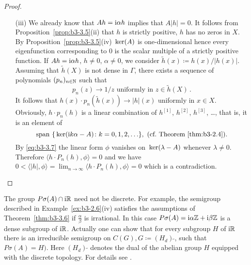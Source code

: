 \begin{proof}
\begin{enumerate}[wide, labelindent=.5em]
	\item[(iii)] 
	We already know that $Ah = \mathrm{i}\alpha h$ implies that $A|h| = 0$.
	It follows from Proposition~\ref{prop:b3-3.5}(ii) that $h$ is strictly positive, \ie $h$ has no zeros in $X$.
	By Proposition~\ref{prop:b3-3.5}(iv) $\mathop{}\mathrm{ker}(A)$ is one-dimensional hence every
	eigenfunction corresponding to $0$ is the scalar multiple of a strictly positive function.
	If $Ah = \mathrm{i}\alpha h$, $h \neq 0$, $\alpha \neq 0$, we consider $\tilde{h}(x) \coloneq h(x)/|h(x)|$.
	Assuming that $\tilde{h}(X)$ is not dense in $\Gamma$, there exists a sequence of polynomials $(p_{n})_{n\in\mathbb{N}}$ such that
	\begin{equation}\label{eq:b3-3.8}
		p_{n}(z) \to 1/z \text{ uniformly in } z \in \tilde{h}(X)\,.
	\end{equation}
	It follows that $h(x)\cdot p_{n}(\tilde{h}(x)) \to |h|(x)$ uniformly in $x \in X$.
	Obviously, $h\cdot p_{n}(h)$ is a linear combination of $h^{[1]}$, $h^{[2]}$, $h^{[3]}$, \ldots, that is, it is an element of
	\[
	\text{span $\{\Kern{ \im k\alpha - A} \colon  k=0,1,2,\ldots \}$}, \  \text{(cf.\ Theorem~\ref{thm:b3-2.4})}.
	\]
	By \eqref{eq:b3-3.7} the linear form $\phi$ vanishes on $\mathop{}\mathrm{ker}(\lambda - A)$ whenever $\lambda \neq 0$.
	Therefore $\langle h\cdot P_{n}(h),\phi\rangle = 0$ and we have $0 < \langle|h|,\phi\rangle = \lim_{n\to\infty}\langle h\cdot P_{n}(h),\phi\rangle = 0$ which is a contradiction.
	\end{enumerate}
\end{proof}
The group $P\sigma(A) \cap \mathrm{i}\mathbb{R}$ need not be discrete. 
For example, the semigroup described in Example~\ref{ex:b3-2.6}(iv) satisfies the assumptions of Theorem~\ref{thm:b3-3.6} if $\frac{\alpha}{\beta}$ is irrational. 
In this case $P\sigma(A) = \mathrm{i}\alpha \mathbb{Z} + \mathrm{i}\beta \mathbb{Z}$ is a dense subgroup of $\mathrm{i} \mathbb{R}$. 
Actually one can show that for every subgroup $H$ of $\mathrm{i} \mathbb{R}$ there is an irreducible semigroup on $C(G), G \coloneqq (H_d)\,{\tilde{ }}$, such that $P\sigma(A) = H)$. 
Here $(H_d)\,{\tilde{ }}$ denotes the dual of the abelian group $H$ equipped with the discrete topology. 
For details see \citet[p.62]{greiner:1982}. 

